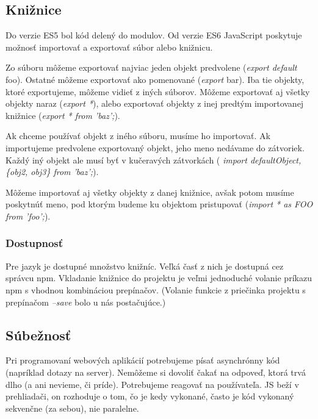 \subsection{Knižnice}
Do verzie ES5 bol kód delený do modulov. Od verzie ES6 JavaScript poskytuje možnosť importovať a exportovať súbor alebo knižnicu.

Zo súboru môžeme exportovať najviac jeden objekt predvolene (\emph{export default} foo). Ostatné môžeme exportovať ako pomenované (\emph{export} bar). 
Iba tie objekty, ktoré exportujeme, môžeme vidieť z iných súborov. 
Môžeme exportovať aj všetky objekty naraz (\emph{export *}), alebo exportovať objekty z inej predtým importovanej knižnice (\emph{export * from 'baz';}).

Ak chceme používať objekt z iného súboru, musíme ho importovať. Ak importujeme predvolene exportovaný objekt, jeho meno nedávame do zátvoriek. 
Každý iný objekt ale musí byť v kučeravých zátvorkách (
\emph{import defaultObject, \{obj2, obj3\} from 'baz';}).

Môžeme importovať aj všetky objekty z danej knižnice, avšak potom musíme poskytnúť meno, pod ktorým budeme ku objektom pristupovať (\emph{import * as FOO from 'foo';}).

\subsubsection{Dostupnosť}
Pre jazyk \JS{} je dostupné množstvo knižníc. Veľká časť z nich je dostupná cez správcu npm. Vkladanie knižnice do projektu je veľmi jednoduché volanie príkazu npm s vhodnou kombináciou prepínačov. (Volanie funkcie z priečinka projektu s prepínačom \emph{--save} bolo u nás postačujúce.)

\subsection{Súbežnosť}
Pri programovaní webových aplikácií potrebujeme písať asynchrónny kód (napríklad dotazy na server). Nemôžeme si dovoliť čakať na odpoveď, ktorá trvá dlho (a ani nevieme, či príde). Potrebujeme reagovať na používateľa.
JS beží v prehliadači, on rozhoduje o tom, čo je kedy vykonané, často je kód vykonaný sekvenčne (za sebou), nie paralelne.

